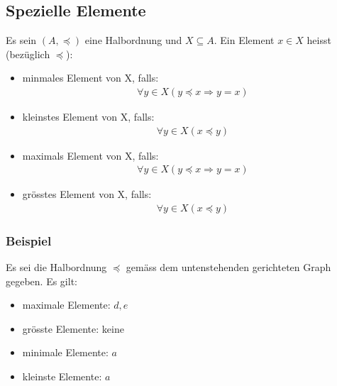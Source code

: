 \subsection{Spezielle Elemente}
Es sein $(A, \preceq)$ eine Halbordnung und $ X \subseteq A$. Ein Element $x \in X$ heisst (bezüglich $\preceq$):
\begin{itemize}
    \item minmales Element von X, falls:
    \begin{align*}
        \forall{y} \in X(y \preceq x \Rightarrow y = x)
    \end{align*}
    \item kleinstes Element von X, falls:
    \begin{align*}
        \forall{y} \in X(x \preceq y)
    \end{align*}
    \item maximals Element von X, falls:
    \begin{align*}
        \forall{y} \in X(y \preceq x \Rightarrow y = x)
    \end{align*}
    \item grösstes Element von X, falls:
    \begin{align*}
        \forall{y} \in X(x \preceq y)
    \end{align*}
\end{itemize}
\subsubsection{Beispiel}
Es sei die Halbordnung $\preceq$ gemäss dem untenstehenden gerichteten
Graph gegeben. Es gilt:
\begin{itemize}
    \item maximale Elemente: $d,e$
    \item grösste Elemente: keine
    \item minimale Elemente: $a$
    \item kleinste Elemente: $a$
\end{itemize}
\begin{center}
\end{center}
